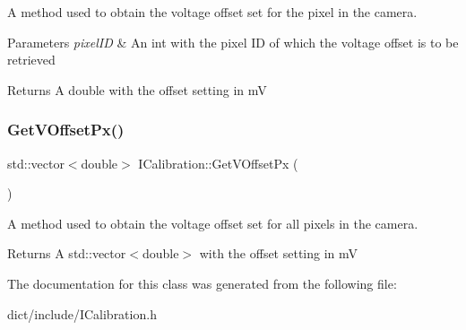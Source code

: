 A method used to obtain the voltage offset set for the pixel in the camera. 


\begin{DoxyParams}{Parameters}
{\em pixel\+ID} & An int with the pixel ID of which the voltage offset is to be retrieved\\
\hline
\end{DoxyParams}
\begin{DoxyReturn}{Returns}
A double with the offset setting in mV 
\end{DoxyReturn}
\mbox{\label{classICalibration_a4dbadee1b28bf393a45a8573ad49bc70}} 
\subsubsection{\texorpdfstring{Get\+V\+Offset\+Px()}{GetVOffsetPx()}\hspace{0.1cm}{\footnotesize\ttfamily [2/2]}}
{\footnotesize\ttfamily std\+::vector$<$double$>$ I\+Calibration\+::\+Get\+V\+Offset\+Px (\begin{DoxyParamCaption}{ }\end{DoxyParamCaption})}



A method used to obtain the voltage offset set for all pixels in the camera. 

\begin{DoxyReturn}{Returns}
A std\+::vector$<$double$>$ with the offset setting in mV 
\end{DoxyReturn}


The documentation for this class was generated from the following file\+:\begin{DoxyCompactItemize}
\item 
dict/include/I\+Calibration.\+h\end{DoxyCompactItemize}
